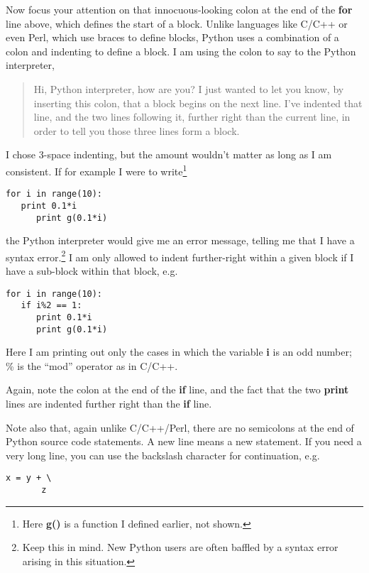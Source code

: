 Now focus your attention on that innocuous-looking colon at the end of
the {\bf for} line above, which defines the start of a block.  Unlike
languages like C/C++ or even Perl, which use braces to define blocks,
Python uses a combination of a colon and indenting to define a block.  I
am using the colon to say to the Python interpreter,

\begin{quote}

Hi, Python interpreter, how are you?  I just wanted to let you know, by
inserting this colon, that a block begins on the next line.  I've
indented that line, and the two lines following it, further right than
the current line, in order to tell you those three lines form a block.  

\end{quote}

I chose 3-space indenting, but the amount wouldn't matter as long as I
am consistent.  If for example I were to write\footnote{Here {\bf g()}
is a function I defined earlier, not shown.}

\begin{Verbatim}[fontsize=\relsize{-2}]
for i in range(10):
   print 0.1*i
      print g(0.1*i)
\end{Verbatim}

the Python interpreter would give me an error message, telling me that I
have a syntax error.\footnote{Keep this in mind.  New Python users are
often baffled by a syntax error arising in this situation.}  I am only
allowed to indent further-right within a given block if I have a
sub-block within that block, e.g.

\begin{Verbatim}[fontsize=\relsize{-2}]
for i in range(10):
   if i%2 == 1:  
      print 0.1*i
      print g(0.1*i)
\end{Verbatim}

Here I am printing out only the cases in which the variable {\bf i} is
an odd number; \% is the ``mod'' operator as in C/C++.

Again, note the colon at the end of the {\bf if} line, and the fact that
the two {\bf print} lines are indented further right than the {\bf if}
line. 

Note also that, again unlike C/C++/Perl, there are no semicolons at the
end of Python source code statements.  A new line means a new
statement.  If you need a very long line, you can use the
backslash character for continuation, e.g.

\begin{Verbatim}[fontsize=\relsize{-2}]
x = y + \
       z
\end{Verbatim}

